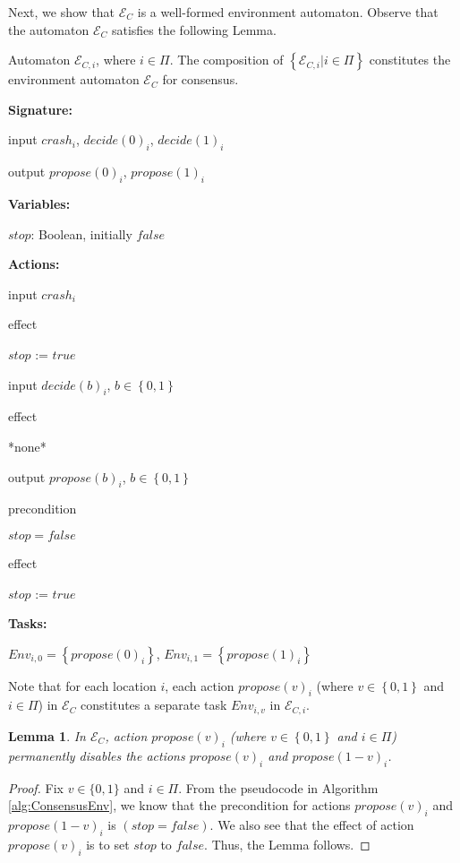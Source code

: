 \documentclass[11pt]{article}
\numberwithin{theorem}{section}
\newtheorem{lemma}[theorem]{Lemma}
\newcommand{\tab}{\hspace{5mm}}
\newcommand{\set}[1]{\left\{#1\right\}}
\begin{document}
Next, we show that $\mathcal{E}_C$ is a well-formed environment automaton. Observe that the automaton $\mathcal{E}_{C}$ satisfies the following Lemma.



\begin{algorithm}\footnotesize
\caption{Automaton $\mathcal{E}_{C,i}$, where $i \in \Pi$. The composition of $\set{\mathcal{E}_{C,i} | i \in\Pi}$ constitutes the environment automaton $\mathcal{E}_C$ for consensus.}
\label{alg:ConsensusEnv}

\textbf{Signature:}

\tab input $crash_i$, $decide(0)_i$, $decide(1)_i$

\tab output $propose(0)_i$, $propose(1)_i$

\textbf{Variables:}

\tab $stop$: Boolean, initially $false$


\textbf{Actions:}

\tab input $crash_i$

\tab effect

\tab \tab $stop$ := $true$

\tab

\tab input $decide(b)_i$, $b \in \set{0,1}$

\tab effect

\tab \tab *none*

\tab

\tab output $propose(b)_i$, $b \in \set{0,1}$

\tab precondition

\tab \tab $stop = false$

\tab effect

\tab \tab $stop$ := $true$

\tab

\textbf{Tasks:}

\tab $Env_{i,0} = \set{propose(0)_i}$, $Env_{i,1} = \set{propose(1)_i}$

\end{algorithm}



Note that for each location $i$, each action $propose(v)_i$ (where $v \in \set{0,1}$ and $i \in \Pi$) in $\mathcal{E}_C$ constitutes a separate task $Env_{i,v}$ in $\mathcal{E}_{C,i}$.

\begin{lemma}\label{prop:proposeDisables}
 In $\mathcal{E}_C$, action $propose(v)_i$ (where $v \in \set{0,1}$ and $i \in \Pi$) permanently disables the actions $propose(v)_i$ and $propose(1-v)_i$.
\end{lemma}
\begin{proof}
 Fix $v \in \{0,1\}$ and $i \in \Pi$. From the pseudocode in Algorithm \ref{alg:ConsensusEnv}, we know that the precondition for actions $propose(v)_i$ and $propose(1-v)_i$ is $(stop = false)$. We also see that the effect of action $propose(v)_i$ is to set $stop$ to $false$. Thus, the Lemma follows.
\end{proof}
\end{document}
